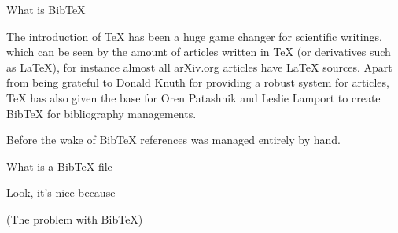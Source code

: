 What is Bib{\TeX}

The introduction of {\TeX} has been a huge game changer for scientific
writings, which can be seen by the amount of articles written in
{\TeX} (or derivatives such as {\LaTeX}), for instance almost all
arXiv.org articles have {\LaTeX} sources.  Apart from being grateful
to Donald Knuth for providing a robust system for articles, {\TeX} has
also given the base for Oren Patashnik and Leslie Lamport to create
Bib{\TeX} for bibliography managements.

Before the wake of Bib{\TeX} references was managed entirely by hand.


What is a Bib{\TeX} file

Look, it's nice because

(The problem with Bib{\TeX})